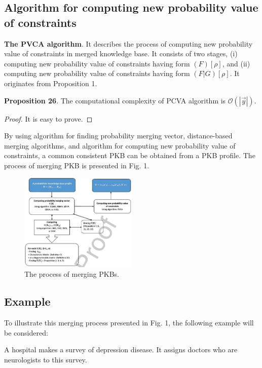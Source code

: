\documentclass[]{iosart2c}
\begin{document}
  \subsection{Algorithm for computing new probability value of constraints}

  \textbf{The PVCA algorithm}. It describes the process of computing new probability value of constraints in merged knowledge base. It consists of two stages, (i) computing new probability value of constraints having form $(F)[\rho]$, and (ii) computing new probability value of constraints having form $(F|G)[\rho]$. It originates from Proposition 1.

  \textbf{Proposition 26}. The computational complexity of PCVA algorithm is $\mathcal{O}(|\vec{y} |)$.

  \begin{proof}
    It is easy to prove.
  \end{proof}


  By using algorithm for finding probability merging vector, distance-based merging algorithms, and algorithm for computing new probability value of constraints, a common consistent PKB can be obtained from a PKB profile. The process of merging PKB is presented in Fig. 1.

  \begin{figure}[t]
    \caption{The process of merging PKBs.}
    \centering
    \includegraphics[width=0.5\textwidth]{figure1}
  \end{figure}

  \subsection{Example}

  To illustrate this merging process presented in Fig. 1, the following example will be considered:

  A hospital makes a survey of depression disease. It assigns doctors who are neurologists to this survey.
\end{document}
